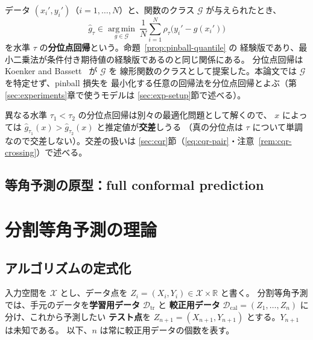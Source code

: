 \documentclass[a4paper,11pt]{jsarticle}
\theoremstyle{definition}
\theoremstyle{plain}
\theoremstyle{remark}
\newcommand{\Real}{\mathbb{R}}
\newcommand{\Dtr}{\mathcal{D}_{\mathrm{tr}}}     %
\newcommand{\Dcal}{\mathcal{D}_{\mathrm{cal}}}   %
\begin{document}
データ $(x_i',y_i')$（$i=1,\dots,N$）と、関数のクラス $\mathcal{G}$ が与えられたとき、
\begin{equation}
  \label{eq:quantile-regression}
  \hat g_\tau\in\operatorname*{arg\,min}_{g\in\mathcal{G}}\
  \frac1N\sum_{i=1}^{N}\rho_\tau\bigl(y_i'-g(x_i')\bigr)
\end{equation}
を水準 $\tau$ の\textbf{分位点回帰}という。命題~\ref{prop:pinball-quantile} の
経験版であり、最小二乗法が条件付き期待値の経験版であるのと同じ関係にある。
分位点回帰は Koenker and Bassett~\cite{koenker1978regression} が $\mathcal{G}$ を
線形関数のクラスとして提案した。本論文では $\mathcal{G}$ を特定せず、pinball 損失を
最小化する任意の回帰法を分位点回帰とよぶ（第\ref{sec:experiments}章で使うモデルは
\ref{sec:exp-setup}節で述べる）。

異なる水準 $\tau_1<\tau_2$ の分位点回帰は別々の最適化問題として解くので、
$x$ によっては $\hat g_{\tau_1}(x)>\hat g_{\tau_2}(x)$ と推定値が\textbf{交差}しうる
（真の分位点は $\tau$ について単調なので交差しない）。交差の扱いは
\ref{sec:cqr}節（\eqref{eq:cqr-pair}・注意~\ref{rem:cqr-crossing}）で述べる。

\subsection{等角予測の原型：full conformal prediction}

\section{分割等角予測の理論}
\label{sec:split-theory}

\subsection{アルゴリズムの定式化}
\label{sec:split-algorithm}

入力空間を $\mathcal{X}$ とし、データ点を $Z_i=(X_i,Y_i)\in\mathcal{X}\times\Real$ と書く。
分割等角予測では、手元のデータを\textbf{学習用データ} $\Dtr$ と
\textbf{較正用データ} $\Dcal=(Z_1,\dots,Z_n)$ に分け、これから予測したい
\textbf{テスト点}を $Z_{n+1}=(X_{n+1},Y_{n+1})$ とする。$Y_{n+1}$ は未知である。
以下、$n$ は常に較正用データの個数を表す。
\end{document}
